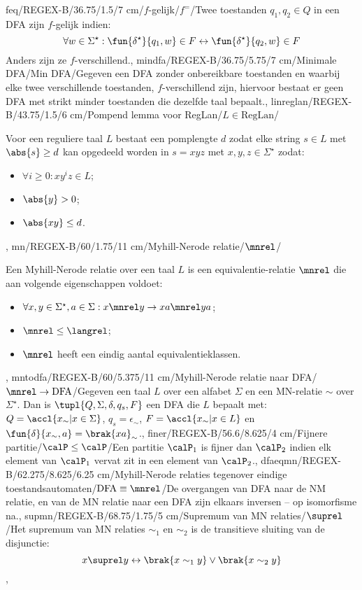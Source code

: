 feq/REGEX-B/36.75/1.5/7 cm/{$f$-gelijk}/$f^=$/{Twee toestanden $q_1,q_2\in Q$ in een DFA zijn $f$-gelijk indien:\[\forall w\in\Sigma^{\star}:\fun{\delta^{\star}}{q_1,w}\in F\leftrightarrow\fun{\delta^{\star}}{q_2,w}\in F\]Anders zijn ze $f$-verschillend.},
mindfa/REGEX-B/36.75/5.75/7 cm/{Minimale DFA}/Min DFA/{Gegeven een DFA zonder onbereikbare toestanden en waarbij elke twee verschillende toestanden, $f$-verschillend zijn, hiervoor bestaat er geen DFA met strikt minder toestanden die dezelfde taal bepaalt.},
linreglan/REGEX-B/43.75/1.5/6 cm/Pompend lemma voor RegLan/$L\in\mbox{RegLan}$/{Voor een reguliere taal $L$ bestaat een pomplengte $d$ zodat elke string $s\in L$ met $\abs{s}\geq d$ kan opgedeeld worden in $s=xyz$ met $x,y,z\in\Sigma^{\star}$ zodat:\begin{itemize}\item $\forall i\geq 0:xy^iz\in L$;\item $\abs{y}>0$;\item $\abs{xy}\leq d$.\end{itemize}},
mn/REGEX-B/60/1.75/11 cm/Myhill-Nerode relatie/$\mnrel$/{Een Myhill-Nerode relatie over een taal $L$ is een equivalentie-relatie $\mnrel$ die aan volgende eigenschappen voldoet:\begin{itemize}\item $\forall x,y\in\Sigma^{\star},a\in\Sigma:x\mnrel y\rightarrow xa\mnrel ya$;\item $\mnrel\leq\langrel$;\item $\mnrel$ heeft een eindig aantal equivalentieklassen.\end{itemize}},
mntodfa/REGEX-B/60/5.375/11 cm/Myhill-Nerode relatie naar DFA/$\mnrel\rightarrow\mbox{DFA}$/{Gegeven een taal $L$ over een alfabet $\Sigma$ en een MN-relatie $\sim$ over $\Sigma^{\star}$. Dan is $\tupl{Q,\Sigma,\delta,q_s,F}$ een DFA die $L$ bepaalt met: $Q=\accl{x_{\sim}|x\in\Sigma}$, $q_s=\epsilon_{\sim}$, $F=\accl{x_{\sim}|x\in L}$ en $\fun{\delta}{x_{\sim},a}=\brak{xa}_{\sim}$.},
finer/REGEX-B/56.6/8.625/4 cm/Fijnere partitie/{$\calP\leq\calP$}/{Een partitie $\calP_1$ is fijner dan $\calP_2$ indien elk element van $\calP_1$ vervat zit in een element van $\calP_2$.},
dfaeqmn/REGEX-B/62.275/8.625/6.25 cm/Myhill-Nerode relaties tegenover eindige toestandsautomaten/$\mbox{DFA}\equiv\mnrel$/{De overgangen van DFA naar de NM relatie, en van de MN relatie naar een DFA zijn elkaars inversen -- op isomorfisme na.},
supmn/REGEX-B/68.75/1.75/5 cm/Supremum van MN relaties/$\suprel$/{Het supremum van MN relaties $\sim_1$ en $\sim_2$ is de transitieve sluiting van de disjunctie:\[x\suprel y\leftrightarrow\brak{x\sim_1 y}\vee\brak{x\sim_2 y}\]},
